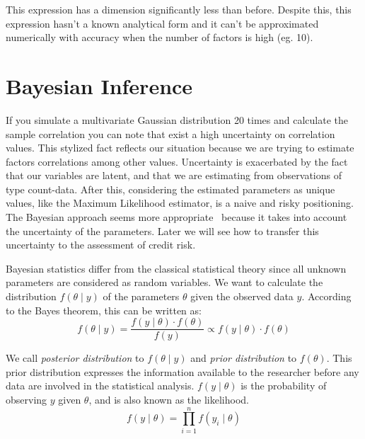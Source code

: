 \documentclass[11pt,fleqn]{book} %
\begin{document}
This expression has a dimension significantly less than before. Despite this, 
this expression hasn't a known analytical form and it can't be approximated 
numerically with accuracy when the number of factors is high (eg. 10).


\section{Bayesian Inference}

If you simulate a multivariate Gaussian distribution 20 times and calculate the
sample correlation you can note that exist a high uncertainty on correlation 
values. This stylized fact reflects our situation because we are trying to 
estimate factors correlations among other values. Uncertainty is exacerbated 
by the fact that our variables are latent, and that we are estimating from 
observations of type count-data. After this, considering the estimated 
parameters as unique values, like the Maximum Likelihood estimator, is a 
naive and risky positioning. The Bayesian approach seems  more 
appropriate~\cite{gossl:2005,tarashev:2010} because it takes into account 
the uncertainty of the parameters. Later we will see how to transfer this 
uncertainty to the assessment of credit risk.

Bayesian statistics differ from the classical statistical theory since all 
unknown parameters are considered as random variables. We want to calculate 
the distribution $f(\theta \mid y)$ of the parameters $\theta$ given the 
observed data $y$. According to the Bayes theorem, this can be written as:
\begin{displaymath}
	f(\theta \mid y) = \frac{f(y \mid \theta) \cdot f(\theta)}{f(y)} \propto f(y \mid \theta) \cdot f(\theta)
\end{displaymath}

We call \emph{posterior distribution} to $f(\theta \mid y)$ and 
\emph{prior distribution} to $f(\theta)$. This prior distribution 
expresses the information available to the researcher before 
any data are involved in the statistical analysis. $f(y \mid \theta)$ 
is the probability of observing $y$ given $\theta$, and is also 
known as the likelihood.
\begin{displaymath}
	f(y \mid \theta) = \prod_{i=1}^n f(y_i \mid \theta)
\end{displaymath}
\end{document}
